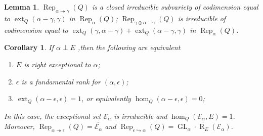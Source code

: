 \documentclass{amsart}
\newtheorem{lemma}[theorem]{Lemma}
\newtheorem{corollary}[theorem]{Corollary}
\theoremstyle{definition}
\theoremstyle{remark}
\numberwithin{equation}{section}
\begin{document}
\begin{lemma} \label{L:codimgen} ${\operatorname{Rep}}_{\alpha\twoheadrightarrow\gamma}(Q)$ is a closed irreducible subvariety of codimension equal to ${\operatorname{ext}}_Q(\alpha-\gamma,\gamma)$ in ${\operatorname{Rep}}_\alpha(Q)$; ${\operatorname{Rep}}_{\gamma\oplus\alpha-\gamma}(Q)$ is irreducible of codimension equal to ${\operatorname{ext}}_Q(\gamma,\alpha-\gamma)+{\operatorname{ext}}_Q(\alpha-\gamma,\gamma)$ in ${\operatorname{Rep}}_\alpha(Q)$.
\end{lemma}

\begin{corollary} \label{C:exc} If $\alpha\perp E$ ,then the following are equivalent \begin{enumerate}
\item[(1)] $E$ is right exceptional to $\alpha$;
\item[(2)] $\epsilon$ is a fundamental rank for $(\alpha,\epsilon)$;
\item[(3)] ${\operatorname{ext}}_Q(\alpha-\epsilon,\epsilon)=1$, or equivalently $\hom_Q(\alpha-\epsilon,\epsilon)=0$;
\end{enumerate}
In this case, the exceptional set ${\mathcal{{E}}}_\alpha$ is irreducible and $\hom_Q({\mathcal{{E}}}_\alpha,E)=1$. Moreover, ${\operatorname{Rep}}_{\alpha\twoheadrightarrow\epsilon}(Q)=\overline{{\mathcal{{E}}}_\alpha}$ and ${\operatorname{Rep}}_{\epsilon\hookrightarrow\alpha}(Q)=\overline{{\operatorname{GL}}_\alpha\cdot{\operatorname{R}}_E({\mathcal{{E}}}_\alpha)}$.
\end{corollary}
\end{document}
